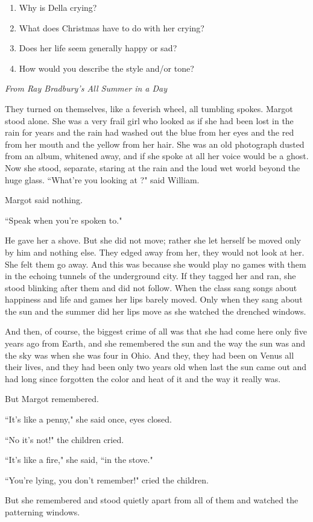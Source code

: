 \documentclass[12pt]{book}
\renewcommand{\indent}{\hspace{1cm}}
\begin{document}
\begin{enumerate}
\item Why is Della crying?
\vfill\item What does Christmas have to do with her crying?  
\vfill\item Does her life seem generally happy or sad?  
\vfill\item How would you describe the style and/or tone?
\end{enumerate}

\vfill

\newpage
\textit{From Ray Bradbury's All Summer in a Day}

\bigskip
\begin{linenumbers*}
\modulolinenumbers[5]
\indent They turned on themselves, like a feverish wheel, all tumbling spokes. Margot stood alone. She was a very frail girl who looked as if she had been lost in the rain for years and the rain had washed out the blue from her eyes and the red from her mouth and the yellow from her hair. She was an old photograph dusted from an album, whitened away, and if she spoke at all her voice would be a ghost. Now she stood, separate, staring at the rain and the loud wet world beyond the huge glass.
``What're you looking at ?" said William.

Margot said nothing.

``Speak when you're spoken to."

\indent He gave her a shove. But she did not move; rather she let herself be moved only by him and nothing else. They edged away from her, they would not look at her. She felt them go away. And this was because she would play no games with them in the echoing tunnels of the underground city. If they tagged her and ran, she stood blinking after them and did not follow. When the class sang songs about happiness and life and games her lips barely moved. Only when they sang about the sun and the summer did her lips move as she watched the drenched windows.

\indent And then, of course, the biggest crime of all was that she had come here only five years ago from Earth, and she remembered the sun and the way the sun was and the sky was when she was four in Ohio. And they, they had been on Venus all their lives, and they had been only two years old when last the sun came out and had long since forgotten the color and heat of it and the way it really was.

\indent But Margot remembered.

\indent ``It's like a penny," she said once, eyes closed.

\indent ``No it's not!" the children cried.

\indent ``It's like a fire," she said, ``in the stove."

\indent ``You're lying, you don't remember!" cried the children.

\indent But she remembered and stood quietly apart from all of them and watched the patterning windows. 
\end{linenumbers*}
\end{document}

